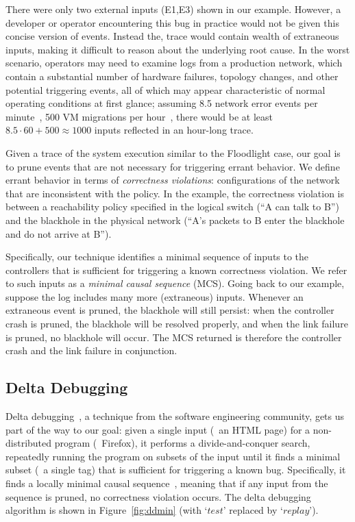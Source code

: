 There were only two external inputs (E1,E3) shown in our example.
However, a developer or operator encountering this bug in practice would not be
given this concise version of events. Instead the, trace would contain wealth
of extraneous inputs, making it difficult
to reason about the underlying root cause.
In the worst scenario, operators may need to examine logs from a production
network, which contain a substantial number of hardware failures, topology changes,
and other potential triggering events,
all of which may appear characteristic of normal operating
conditions at first glance; assuming 8.5 network error events per
minute~\cite{Greenberg:2009:VSF:1592568.1592576}, 500 VM migrations per
hour~\cite{Soundararajan:2010:CBS:1899928.1899941},
there would be at least $8.5 \cdot 60 + 500 \approx 1000$ inputs reflected in
an hour-long trace.

Given a trace of the system execution similar to the Floodlight case,
our goal is to prune events that are not
necessary for triggering errant behavior. We define errant behavior in terms
of {\em correctness violations}:
configurations of the network that are inconsistent
with the policy. In the example, the correctness violation is between a
reachability policy specified in the logical switch (``A can talk to B'')
and the blackhole in the physical network (``A's packets to B enter the
blackhole and do not arrive at B'').

Specifically, our technique identifies a minimal sequence of inputs
to the controllers that is sufficient for triggering a known correctness violation. We
refer to such inputs as a {\em minimal causal sequence} (MCS). Going back to our example,
suppose the log includes many more (extraneous) inputs. Whenever an
extraneous event is pruned, the blackhole will still persist: when
the controller crash is pruned, the blackhole will be resolved properly, and
when the link failure is pruned, no blackhole will occur. The MCS returned
is therefore the controller crash and the link failure in conjunction.


\subsection{Delta Debugging}
\label{subsec:algorithm}

Delta debugging~\cite{Zeller:1999:YMP:318773.318946}, a technique from the
software engineering community, gets us part of the way
to our goal: given a single input (\eg~an HTML page)
for a non-distributed program (\eg~Firefox), it performs a divide-and-conquer
search, repeatedly running the program on subsets of the input
until it finds a minimal subset (\eg~a single tag) that is sufficient
for triggering a known bug. Specifically, it finds a locally minimal
causal sequence~\cite{Zeller:1999:YMP:318773.318946},
meaning that if any input from the sequence is pruned, no correctness violation
occurs. The delta debugging algorithm is shown in
Figure~\ref{fig:ddmin} (with `$test$' replaced by `$replay$').

